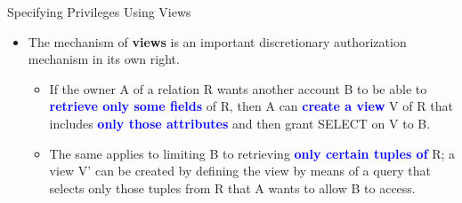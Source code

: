 \begin{frame}{Specifying Privileges Using Views}
    \Large %
    
    \begin{itemize}
        \vspace{-1.5cm} %
        
        \item The mechanism of \textbf{views} is an important discretionary authorization mechanism in its own right.
        
        \begin{itemize}
            \large %
            \setlength{\itemsep}{0.3cm} %
            
            \item If the owner A of a relation R wants another account B to be able to \textbf{\textcolor{blue}{retrieve only some fields}} of R, then A can \textbf{\textcolor{blue}{create a view}} V of R that includes \textbf{\textcolor{blue}{only those attributes}} and then grant SELECT on V to B.
            
            \item The same applies to limiting B to retrieving \textbf{\textcolor{blue}{only certain tuples of}} R; a view V' can be created by defining the view by means of a query that selects only those tuples from R that A wants to allow B to access.
        \end{itemize}
        
    \end{itemize}
\end{frame}


